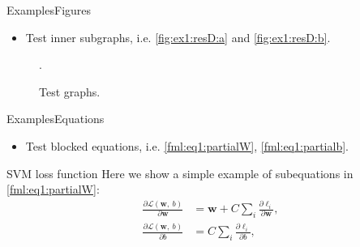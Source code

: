 \documentclass[10pt,xcolor={dvipsnames},aspectratio=169]{beamer}
\begin{document}
\begin{frame}{Examples}{Figures}
\begin{itemize}
  \item Test inner subgraphs, i.e. \cref{fig:ex1:resD:a} and \cref{fig:ex1:resD:b}.
\end{itemize}

\begin{figure}[htbp]
  \centering
  \DeclareGraphicsExtensions.
  \caption{Test graphs.}\label{fig:ex1:resD}
\end{figure}
\end{frame}


\begin{frame}{Examples}{Equations}
\begin{itemize}
  \item Test blocked equations, i.e. \eqref{fml:eq1:partialW}, \eqref{fml:eq1:partialb}.
\end{itemize}

\begin{block}{SVM loss function} \label{blc:eq1}
  Here we show a simple example of subequations in \eqref{fml:eq1:partialW}:
  \begin{subequations}
    \renewcommand{\theequation}
    {\theparentequation-\arabic{equation}}
    \begin{align}
      \frac{\partial \mathcal{L}(\mathbf{w},~b)}{\partial \mathbf{w}} &= \mathbf{w} + C \sum\limits_i\frac{\partial \ell_i}{\partial \mathbf{w}}, \label{fml:eq1:partialW}\\
      \frac{\partial \mathcal{L}(\mathbf{w},~b)}{\partial b} &= C \sum\limits_i\frac{\partial \ell_i}{\partial b}, \label{fml:eq1:partialb}
    \end{align}
  \end{subequations}
\end{block}
\end{frame}
\end{document}
